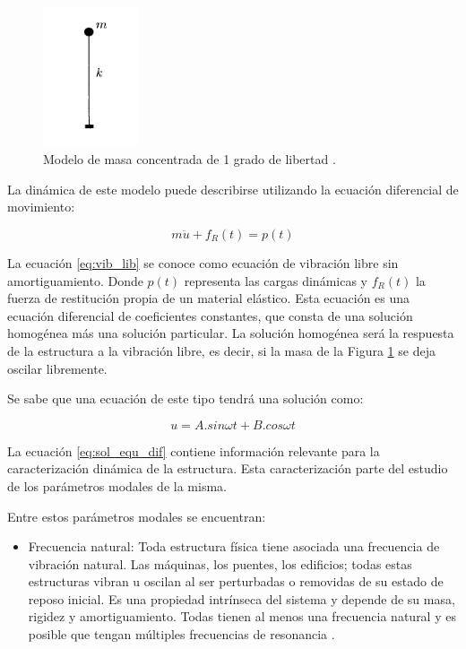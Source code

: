 \begin{itemize}
    \begin{figure}[H]
        \centering
        \includegraphics[width = 0.25\textwidth]{imagenes/cap1_marcoteo/modelo_masa_simple.png}
        \caption{Modelo de masa concentrada de 1 grado de libertad \citep{hurtado2000}.}
        \label{fig:masa_estructural}
    \end{figure}

    La dinámica de este modelo puede describirse utilizando la ecuación diferencial de movimiento:

    \begin{equation} \label{eq:vib_lib}
        m\ddot{u} + f_R(t) = p(t)
    \end{equation}

    La ecuación \ref{eq:vib_lib} se conoce como ecuación de vibración libre sin amortiguamiento. Donde $p(t)$ representa las cargas dinámicas y $f_R(t)$ la fuerza de restitución propia de un material elástico.  Esta ecuación es una ecuación diferencial de coeficientes constantes, que consta de una solución homogénea más una solución particular. La solución homogénea será la respuesta de la estructura a la vibración libre, es decir, si la masa de la Figura \ref{fig:masa_estructural} se deja oscilar libremente.

    Se sabe que una ecuación de este tipo tendrá una solución como:

    \begin{equation} \label{eq:sol_equ_dif}
        u = A.sin\omega t + B.cos\omega t
    \end{equation}

    La ecuación \ref{eq:sol_equ_dif} contiene información relevante para la caracterización dinámica de la estructura. Esta caracterización parte del estudio de los parámetros modales de la misma.

    Entre estos parámetros modales se encuentran: 
        \begin{itemize}
            \item Frecuencia natural: Toda estructura física tiene asociada una frecuencia de vibración natural. Las máquinas, los puentes, los edificios; todas estas estructuras vibran u oscilan al ser perturbadas o removidas de su estado de reposo inicial. Es una propiedad intrínseca del sistema y depende de su masa, rigidez y amortiguamiento. Todas tienen al menos una frecuencia natural y es posible que tengan múltiples frecuencias de resonancia \citep{irvine2000introduction}. 
            

\end{itemize}
\end{itemize}
